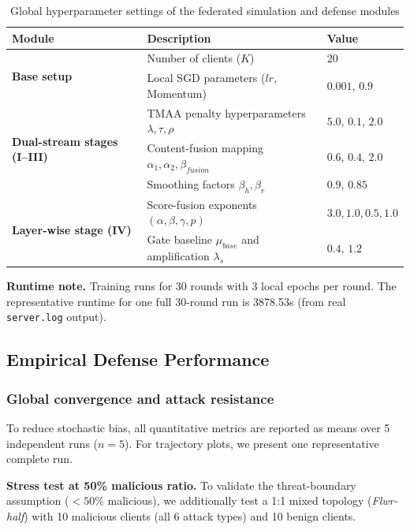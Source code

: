 \documentclass[runningheads]{llncs}
\begin{document}
\begin{table}[htbp]
\centering
\caption{Global hyperparameter settings of the federated simulation and defense modules}
\label{tab:hyperparams}
\begin{tabular}{p{4cm} p{8.5cm} p{2cm}}
\toprule
\textbf{Module} & \textbf{Description} & \textbf{Value} \\
\midrule
\multirow{2}{*}{\textbf{Base setup}} & Number of clients ($K$) & $20$ \\
& Local SGD parameters ($lr$, Momentum) & $0.001$, $0.9$ \\
\midrule
\multirow{3}{*}{\textbf{Dual-stream stages (I--III)}} & TMAA penalty hyperparameters $\lambda,\tau,\rho$ & $5.0$, $0.1$, $2.0$ \\
& Content-fusion mapping $\alpha_1,\alpha_2,\beta_{fusion}$ & $0.6$, $0.4$, $2.0$ \\
& Smoothing factors $\beta_h,\beta_r$ & $0.9$, $0.85$ \\
\midrule
\multirow{2}{*}{\textbf{Layer-wise stage (IV)}} & Score-fusion exponents $(\alpha,\beta,\gamma,p)$ & $3.0, 1.0, 0.5, 1.0$ \\
& Gate baseline $\mu_{base}$ and amplification $\lambda_s$ & $0.4$, $1.2$ \\
\bottomrule
\end{tabular}
\end{table}

\textbf{Runtime note.} Training runs for 30 rounds with 3 local epochs per round. The representative runtime for one full 30-round run is 3878.53s (from real \texttt{server.log} output).

\subsection{Empirical Defense Performance}

\subsubsection{Global convergence and attack resistance}
To reduce stochastic bias, all quantitative metrics are reported as means over 5 independent runs ($n=5$). For trajectory plots, we present one representative complete run.

\textbf{Stress test at 50\% malicious ratio.} To validate the threat-boundary assumption ($<50\%$ malicious), we additionally test a 1:1 mixed topology (\textit{Flwr-half}) with 10 malicious clients (all 6 attack types) and 10 benign clients.
\end{document}
